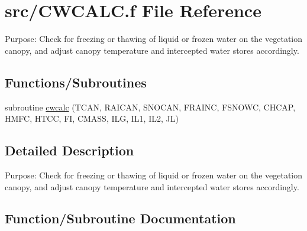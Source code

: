 \hypertarget{CWCALC_8f}{}\section{src/\+C\+W\+C\+A\+L\+C.f File Reference}
\label{CWCALC_8f}


Purpose\+: Check for freezing or thawing of liquid or frozen water on the vegetation canopy, and adjust canopy temperature and intercepted water stores accordingly.  


\subsection*{Functions/\+Subroutines}
\begin{DoxyCompactItemize}
\item 
subroutine \hyperlink{CWCALC_8f_a1c51886dfe7782b7a65415cc66561efb}{cwcalc} (T\+C\+A\+N, R\+A\+I\+C\+A\+N, S\+N\+O\+C\+A\+N, F\+R\+A\+I\+N\+C, F\+S\+N\+O\+W\+C, C\+H\+C\+A\+P, H\+M\+F\+C, H\+T\+C\+C, F\+I, C\+M\+A\+S\+S, I\+L\+G, I\+L1, I\+L2, J\+L)
\end{DoxyCompactItemize}


\subsection{Detailed Description}
Purpose\+: Check for freezing or thawing of liquid or frozen water on the vegetation canopy, and adjust canopy temperature and intercepted water stores accordingly. 



\subsection{Function/\+Subroutine Documentation}
\hypertarget{CWCALC_8f_a1c51886dfe7782b7a65415cc66561efb}{}
